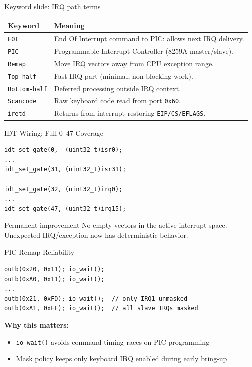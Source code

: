 \documentclass[aspectratio=169]{beamer}
\newcommand{\concept}[2]{%
  \begin{block}{#1}\smallskip #2\smallskip\end{block}\vspace{5pt}}
\begin{document}
\begin{frame}[fragile]{Keyword slide: IRQ path terms}
  \small
  \begin{tabular}{@{}p{2.5cm}p{9.5cm}@{}}
    \toprule
    \textbf{Keyword} & \textbf{Meaning} \\
    \midrule
    \texttt{EOI} & End Of Interrupt command to PIC: allows next IRQ delivery. \\
    \texttt{PIC} & Programmable Interrupt Controller (8259A master/slave). \\
    \texttt{Remap} & Move IRQ vectors away from CPU exception range. \\
    \texttt{Top-half} & Fast IRQ part (minimal, non-blocking work). \\
    \texttt{Bottom-half} & Deferred processing outside IRQ context. \\
    \texttt{Scancode} & Raw keyboard code read from port \texttt{0x60}. \\
    \texttt{iretd} & Returns from interrupt restoring \texttt{EIP/CS/EFLAGS}. \\
    \bottomrule
  \end{tabular}
\end{frame}

\begin{frame}[fragile]{IDT Wiring: Full 0--47 Coverage}
  \begin{lstlisting}[style=clang]
idt_set_gate(0,  (uint32_t)isr0);
...
idt_set_gate(31, (uint32_t)isr31);

idt_set_gate(32, (uint32_t)irq0);
...
idt_set_gate(47, (uint32_t)irq15);
  \end{lstlisting}
  \concept{Permanent improvement}{
    No empty vectors in the active interrupt space. Unexpected IRQ/exception now has deterministic behavior.
  }
\end{frame}

\begin{frame}[fragile]{PIC Remap Reliability}
  \begin{lstlisting}[style=clang]
outb(0x20, 0x11); io_wait();
outb(0xA0, 0x11); io_wait();
...
outb(0x21, 0xFD); io_wait();  // only IRQ1 unmasked
outb(0xA1, 0xFF); io_wait();  // all slave IRQs masked
  \end{lstlisting}
  \textbf{Why this matters:}
  \begin{itemize}
    \item \texttt{io\_wait()} avoids command timing races on PIC programming
    \item Mask policy keeps only keyboard IRQ enabled during early bring-up
  \end{itemize}
\end{frame}
\end{document}

